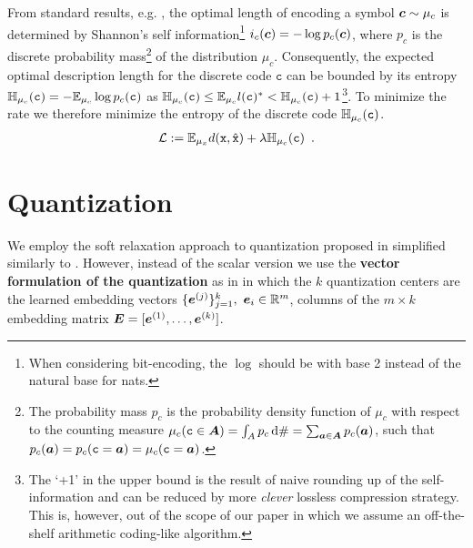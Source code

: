 \documentclass{article} %
\renewcommand{\rvx}{\mathtt{x}}
\renewcommand{\rvc}{\mathtt{c}}
\newcommand{\dd}{\, \textnormal{d}}
\newcommand{\pc}{p_c}
\newcommand{\mux}{\mu_x}
\newcommand{\muc}{\mu_c}
\newcommand{\Hc}{\sH_{\muc}}
\newcommand{\gEt}{\gE_\theta}
\begin{document}
From standard results, e.g. \citet{coverElementsInformationTheory2006}, the optimal length of encoding a symbol $\vc \sim \muc$ is determined by Shannon's self information\footnote{When considering bit-encoding, the $\log$ should be with base 2 instead of the natural base for nats.} $i_c(\vc) = - \log \pc(\vc)$, where $\pc$ is the discrete probability mass\footnote{The probability mass $\pc$ is the probability density function of $\muc$ with respect to the counting measure $\muc(\rvc \in \mA) = \int_A \pc \dd \# = \sum_{\va \in \mA} \pc(\va)$, such that $\pc(\va) = \pc(\rvc = \va) = \muc(\rvc = \va)$.} of the distribution $\muc$.
Consequently, the expected optimal description length for the discrete code $\rvc$ can be bounded by its entropy $\Hc(\rvc) = - \E_{\muc} \log \pc(\rvc)$ as $\Hc(\rvc) \leq \E_{\muc} l(\rvc)^* < \Hc(\rvc) + 1$\footnote{The `+1' in the upper bound is the result of naive rounding up of the self-information and can be reduced by more \emph{clever} lossless compression strategy. This is, however, out of the scope of our paper in which we assume an off-the-shelf arithmetic coding-like algorithm.}.
To minimize the rate we therefore minimize the entropy of the discrete code $\Hc(\rvc)$.
\begin{align}\label{eq:loss}
\Ls := \E_{\mux} d(\rvx, \hat{\rvx}) + \reg \Hc(\rvc) \enspace .
\end{align}

\section{Quantization}\label{sec:quantization}

We employ the soft relaxation approach to quantization proposed in \citet{agustssonSofttoHardVectorQuantization2017} simplified similarly to \citet{mentzerConditionalProbabilityModels2018}.
However, instead of the scalar version \citet{mentzerConditionalProbabilityModels2018,habibianVideoCompressionRateDistortion2019} we use the \textbf{vector formulation of the quantization} as in \citet{oordNeuralDiscreteRepresentation2017} in which the $k$ quantization centers are the learned embedding vectors $\{{\bm{e}}^{(j)}\}_{j=1}^k, \ {\bm{e}}_i \in {\mathbb{R}}^m$, columns of the $m \times k$ embedding matrix ${\bm{E}} = [{\bm{e}}^{(1)}, \ldots, {\bm{e}}^{(k)}]$.

\end{document}
